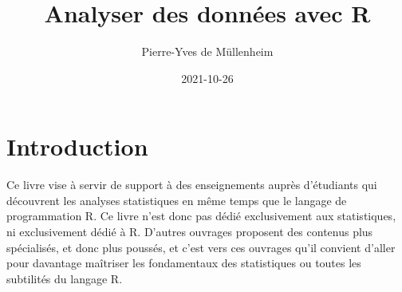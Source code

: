 \documentclass[
  french,
]{book}
\title{Analyser des données avec R}
\author{Pierre-Yves de Müllenheim}
\date{2021-10-26}
\begin{document}
\maketitle

\renewcommand*\contentsname{Sommaire}
{
\setcounter{tocdepth}{1}
\tableofcontents
}
\renewcommand{\listfigurename}{Liste des figures}
\renewcommand{\figurename}{Figure}
\renewcommand{\tablename}{Tableau}

\listoftables

\listoffigures

\hypertarget{introduction}{%
\chapter*{Introduction}\label{introduction}}

Ce livre vise à servir de support à des enseignements auprès d'étudiants qui découvrent les analyses statistiques en même temps que le langage de programmation R. Ce livre n'est donc pas dédié exclusivement aux statistiques, ni exclusivement dédié à R. D'autres ouvrages proposent des contenus plus spécialisés, et donc plus poussés, et c'est vers ces ouvrages qu'il convient d'aller pour davantage maîtriser les fondamentaux des statistiques ou toutes les subtilités du langage R.
\end{document}
